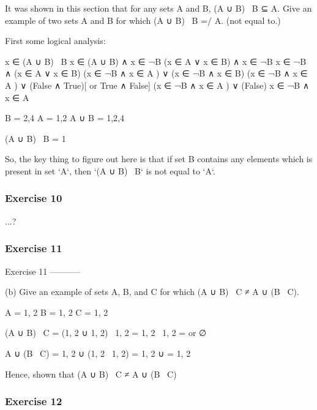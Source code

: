     It was shown in this section that for any sets A and B, (A ∪ B) \ B ⊆ A.
    Give an example of two sets A and B for which (A ∪ B) \ B =/ A.
    (not equal to.)

First some logical analysis:

    x ∈ (A ∪ B) \ B
    x ∈ (A ∪ B) ∧ x ∈ ¬B
    (x ∈ A ∨ x ∈ B) ∧ x ∈ ¬B
    x ∈ ¬B ∧ (x ∈ A ∨ x ∈ B)
    (x ∈ ¬B ∧ x ∈ A ) ∨ (x ∈ ¬B ∧ x ∈ B)
    (x ∈ ¬B ∧ x ∈ A ) ∨ (False ∧ True)[ or True ∧ False]
    (x ∈ ¬B ∧ x ∈ A ) ∨ (False)
    x ∈ ¬B ∧ x ∈ A

B = {2,4}
A = {1,2}
A ∪ B = {1,2,4}

(A ∪ B) \ B = {1}

So, the key thing to figure out here is that if set B contains any
elements which is present in set `A`, then `(A ∪ B) \ B` is not equal
to `A`.


\subsubsection{Exercise 10}
...?

\subsubsection{Exercise 11}
Exercise 11
-----------

    (b) Give an example of sets A, B, and C for which (A ∪ B) \ C ≠ A ∪ (B \ C).

    A = {1, 2}
    B = {1, 2}
    C = {1, 2}

    (A ∪ B) \ C = ({1, 2} ∪ {1, 2}) \ {1, 2}
                = {1, 2} \ {1, 2}
                = {} or ∅

    A ∪ (B \ C) = {1, 2} ∪ ({1, 2} \ {1, 2})
                = {1, 2} ∪ {}
                = {1, 2}
                
    Hence, shown that (A ∪ B) \ C ≠ A ∪ (B \ C)
  
\subsubsection{Exercise 12}

